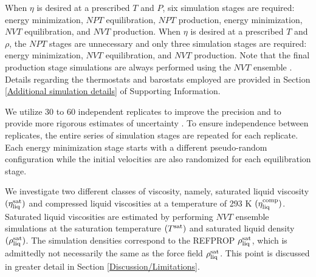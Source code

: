 \documentclass[preprint,review,12pt]{elsarticle}
\begin{document}
	When $\eta$ is desired at a prescribed $T$ and $P$, six simulation stages are required: energy minimization, $NPT$ equilibration, $NPT$ production, energy minimization, $NVT$ equilibration, and $NVT$ production. When $\eta$ is desired at a prescribed $T$ and $\rho$, the $NPT$ stages are unnecessary and only three simulation stages are required: energy minimization, $NVT$ equilibration, and $NVT$ production. Note that the final production stage simulations are always performed using the $NVT$ ensemble \cite{Maginn2018}. Details regarding the thermostats and barostats employed are provided in Section \ref{Additional simulation details} of Supporting Information.
	
	We utilize 30 to 60 independent replicates to improve the precision and to provide more rigorous estimates of uncertainty \cite{Maginn2018,Zhang2015}. To ensure independence between replicates, the entire series of simulation stages are repeated for each replicate. Each energy minimization stage starts with a different pseudo-random configuration while the initial velocities are also randomized for each equilibration stage.
	
	
	
	
	
%	
	
	
		
	We investigate two different classes of viscosity, namely, saturated liquid viscosity $(\eta_{\rm liq}^{\rm sat})$ and compressed liquid viscosities at a temperature of 293 K $(\eta_{\rm liq}^{\rm comp})$. Saturated liquid viscosities are estimated by performing $NVT$ ensemble simulations at the saturation temperature $(T^{\rm sat})$ and saturated liquid density $(\rho_{\rm liq}^{\rm sat})$. The simulation densities correspond to the REFPROP $\rho_{\rm liq}^{\rm sat}$, which is admittedly not necessarily the same as the force field $\rho_{\rm liq}^{\rm sat}$. This point is discussed in greater detail in Section \ref{Discussion/Limitations}. 
	
\end{document}
